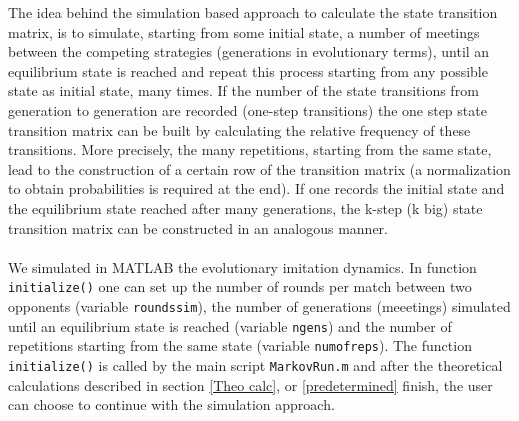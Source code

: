 \documentclass[12pt]{report}
\begin{document}
The idea behind the simulation based approach to calculate the state transition matrix, is to simulate, starting from some initial state, a number of meetings between the competing strategies (generations in evolutionary terms), until an equilibrium state is reached and repeat this process starting from any possible state as initial state, many times. If the number of the state transitions from generation to generation are recorded (one-step transitions) the one step state transition matrix can be built by calculating the relative frequency of these transitions. More precisely, the many repetitions, starting from the same state, lead to the construction of a certain row of the transition matrix (a normalization to obtain probabilities is required at the end). If one records the initial state and the equilibrium state reached after many generations, the k-step (k big) state transition matrix can be constructed in an analogous manner.
\\\\
We simulated in MATLAB the evolutionary imitation dynamics. In function \texttt{initialize()} one can set up the number of rounds per match between two opponents (variable \texttt{roundssim}), the number of generations (meeetings) simulated until an equilibrium state is reached (variable \texttt{ngens}) and the number of repetitions starting from the same state (variable \texttt{numofreps}). The function \texttt{initialize()} is called by the main script \texttt{MarkovRun.m} and after the theoretical calculations described in section \ref{Theo calc}, or \ref{predetermined} finish, the user can choose to continue with the simulation approach.
\\\\
\end{document}
